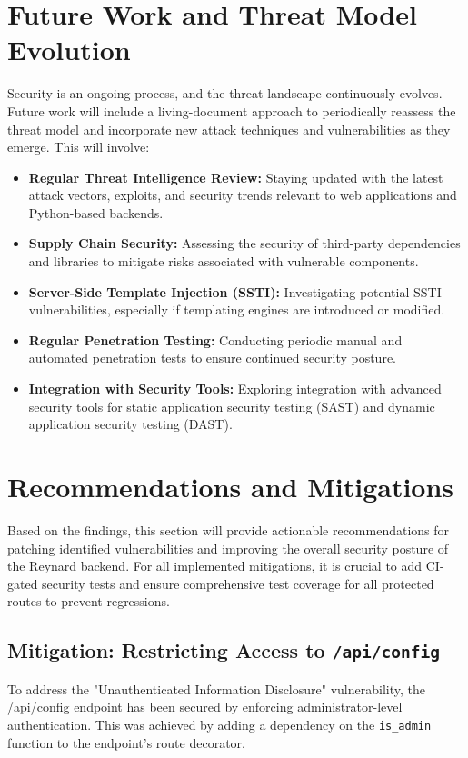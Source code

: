 \documentclass{article}
\begin{document}
\section{Future Work and Threat Model Evolution}
Security is an ongoing process, and the threat landscape continuously evolves. Future work will include a living-document approach to periodically reassess the threat model and incorporate new attack techniques and vulnerabilities as they emerge. This will involve:
\begin{itemize}
    \item \textbf{Regular Threat Intelligence Review:} Staying updated with the latest attack vectors, exploits, and security trends relevant to web applications and Python-based backends.
    \item \textbf{Supply Chain Security:} Assessing the security of third-party dependencies and libraries to mitigate risks associated with vulnerable components.
    \item \textbf{Server-Side Template Injection (SSTI):} Investigating potential SSTI vulnerabilities, especially if templating engines are introduced or modified.
    \item \textbf{Regular Penetration Testing:} Conducting periodic manual and automated penetration tests to ensure continued security posture.
    \item \textbf{Integration with Security Tools:} Exploring integration with advanced security tools for static application security testing (SAST) and dynamic application security testing (DAST).
\end{itemize}

\section{Recommendations and Mitigations}
Based on the findings, this section will provide actionable recommendations for patching identified vulnerabilities and improving the overall security posture of the Reynard backend. For all implemented mitigations, it is crucial to add CI-gated security tests and ensure comprehensive test coverage for all protected routes to prevent regressions.

\subsection{\texorpdfstring{\textbf{Mitigation: Restricting Access to \texttt{/api/config}}}{Mitigation: Restricting Access to /api/config}}
To address the "Unauthenticated Information Disclosure" vulnerability, the \url{/api/config} endpoint has been secured by enforcing administrator-level authentication. This was achieved by adding a dependency on the \texttt{is\_admin} function to the endpoint's route decorator.
\end{document}
